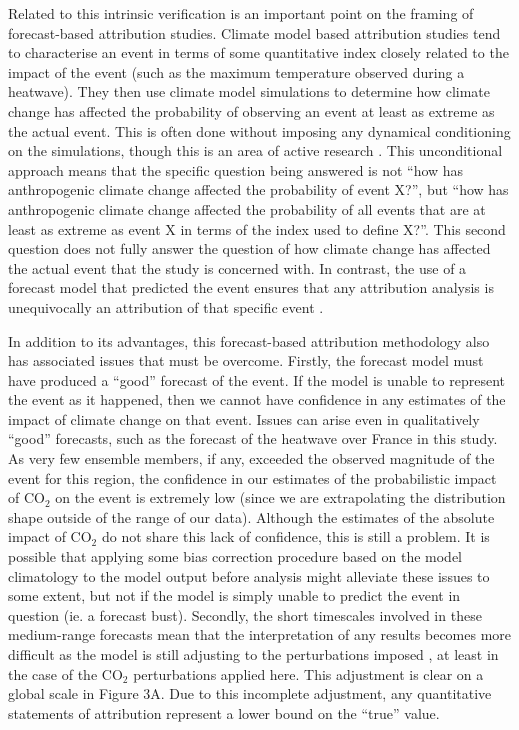   Related to this intrinsic verification is an important point on the framing of forecast-based attribution studies. Climate model based attribution studies tend to characterise an event in terms of some quantitative index closely related to the impact of the event (such as the maximum temperature observed during a heatwave). They then use climate model simulations to determine how climate change has affected the probability of observing an event at least as extreme as the actual event. This is often done without imposing any dynamical conditioning on the simulations, though this is an area of active research \citep{yiou_statistical_2017,pall_diagnosing_2017}. This unconditional approach means that the specific question being answered is not ``how has anthropogenic climate change affected the probability of event X?'', but ``how has anthropogenic climate change affected the probability of all events that are at least as extreme as event X in terms of the index used to define X?''.  This second question does not fully answer the question of how climate change has affected the actual event that the study is concerned with. In contrast, the use of a forecast model that predicted the event ensures that any attribution analysis is unequivocally an attribution of that specific event \citep{hope_determining_2019}.
  
  In addition to its advantages, this forecast-based attribution methodology also has associated issues that must be overcome. Firstly, the forecast model must have produced a ``good'' forecast of the event. If the model is unable to represent the event as it happened, then we cannot have confidence in any estimates of the impact of climate change on that event. Issues can arise even in qualitatively ``good'' forecasts, such as the forecast of the heatwave over France in this study. As very few ensemble members, if any, exceeded the observed magnitude of the event for this region, the confidence in our estimates of the probabilistic impact of CO$_2$ on the event is extremely low (since we are extrapolating the distribution shape outside of the range of our data). Although the estimates of the absolute impact of CO$_2$ do not share this lack of confidence, this is still a problem. It is possible that applying some bias correction procedure \citep[e.g.][]{sippel_novel_2016,jeon_quantile-based_2016,li_reducing_2019} based on the model climatology to the model output before analysis might alleviate these issues to some extent, but not if the model is simply unable to predict the event in question (ie. a forecast bust). Secondly, the short timescales involved in these medium-range forecasts mean that the interpretation of any results becomes more difficult as the model is still adjusting to the perturbations imposed \citep{hope_contributors_2015}, at least in the case of the CO$_2$ perturbations applied here. This adjustment is clear on a global scale in Figure 3A. Due to this incomplete adjustment, any quantitative statements of attribution represent a lower bound on the ``true'' value. 
  
